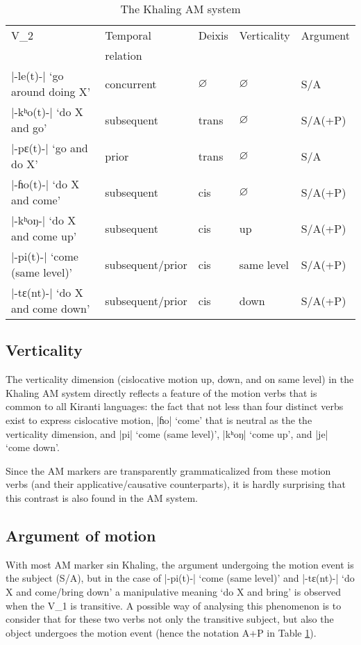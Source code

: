 \documentclass[oneside,a4paper,11pt]{article}
\newcommand{\ipa}[1]{{\phon#1}}
\newcommand{\dhatu}[2]{|\ipa{#1}| `#2'}
\begin{document}
\begin{table}[H]
\caption{The Khaling AM system} \label{tab:system} \centering
\begin{tabular}{lllll}
\toprule
V_2 & Temporal & Deixis & Verticality & Argument \\
& relation \\
\midrule
\dhatu{-le(t)-}{go around doing X} &concurrent& $\varnothing$ & $\varnothing$ & S/A \\
\dhatu{-kʰo(t)-}{do X and go} &subsequent& trans & $\varnothing$ & S/A(+P) \\
\dhatu{-pɛ(t)-}{go and do X} &prior& trans & $\varnothing$ & S/A \\
\dhatu{-ɦo(t)-}{do X and come} &subsequent& cis & $\varnothing$ & S/A(+P) \\
\dhatu{-kʰoŋ-}{do X and come up} &subsequent& cis &up & S/A(+P) \\
 \dhatu{-pi(t)-}{come (same level)} &subsequent/prior& cis &same level & S/A(+P) \\
  \dhatu{-tɛ(nt)-}{do X and come down} &subsequent/prior & cis &down & S/A(+P) \\
\bottomrule
\end{tabular}
\end{table}

 \subsection{Verticality} \label{sec:verticality}
 The verticality dimension (cislocative motion up, down, and on same level) in the Khaling AM system directly reflects a feature of the motion verbs that is common to all Kiranti languages: the fact that not less than four distinct verbs exist to express cislocative motion, \dhatu{ɦo}{come} that is neutral as the the verticality dimension, and \dhatu{pi}{come (same level)}, \dhatu{kʰoŋ}{come up}, and \dhatu{je}{come down}. 
 
 Since the AM markers are transparently grammaticalized from these motion verbs (and their applicative/causative counterparts), it is hardly surprising that this contrast is also found in the AM system.
 
  \subsection{Argument of motion} \label{sec:argument}
With most AM marker sin Khaling, the argument undergoing the motion event is the subject (S/A), but in the case of  \dhatu{-pi(t)-}{come (same level)} and   \dhatu{-tɛ(nt)-}{do X and come/bring down} a manipulative meaning `do X and bring' is observed when the V_1 is transitive. A possible way of analysing this phenomenon is to consider that for these two verbs not only the transitive subject, but also the object undergoes the motion event (hence the notation A+P in Table \ref{tab:system}).
\end{document}
